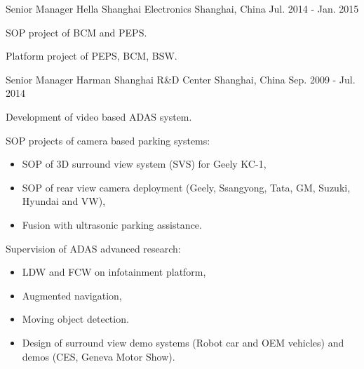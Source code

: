 \documentclass[../cv_xin.tex]{subfiles}
\begin{document}
\begin{cventries}
  \cventry
    {Senior Manager} %
    {Hella Shanghai Electronics} %
    {Shanghai, China} %
    {Jul. 2014 - Jan. 2015} %
    {
      \begin{cvitems}
        \item SOP project of BCM and PEPS.
        \item Platform project of PEPS, BCM, BSW.
      \end{cvitems}
    }

  \cventry
    {Senior Manager} %
    {Harman Shanghai R\&D Center} %
    {Shanghai, China} %
    {Sep. 2009 - Jul. 2014} %
    {
      \begin{cvitems}
        \item Development of video based ADAS system.
        \item SOP projects of camera based parking systems:
          \begin{itemize}
            \item SOP of 3D surround view system (SVS) for Geely KC-1,
            \item SOP of rear view camera deployment (Geely, Ssangyong, Tata, GM, Suzuki, Hyundai and VW),
            \item Fusion with ultrasonic parking assistance.
           \end{itemize}
        \item Supervision of ADAS advanced research:
          \begin{itemize}
            \item LDW and FCW on infotainment platform,
            \item Augmented navigation,
            \item Moving object detection.
            \item Design of surround view demo systems (Robot car and OEM vehicles) and demos (CES, Geneva Motor Show).
          \end{itemize}
      \end{cvitems}
    }
\end{cventries}
\end{document}
